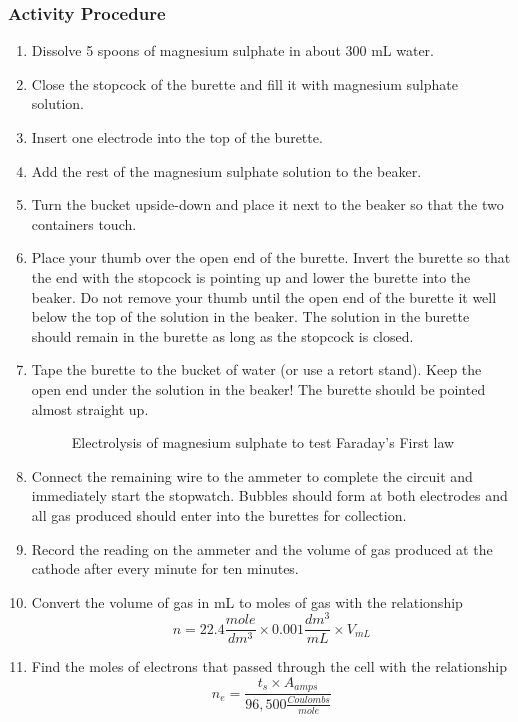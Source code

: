 \subsubsection*{Activity Procedure}
\begin{enumerate}
\item{Dissolve 5 spoons of magnesium sulphate in about 300 mL water.}
\item{Close the stopcock of the burette and fill it with magnesium sulphate solution.}
\item{Insert one electrode into the top of the burette.}
\item{Add the rest of the magnesium sulphate solution to the beaker.}
\item{Turn the bucket upside-down and place it next to the beaker so that the two containers touch.}
\item{Place your thumb over the open end of the burette. Invert the burette so that the end with the stopcock is pointing up and lower the burette into the beaker. Do not remove your thumb until the open end of the burette it well below the top of the solution in the beaker. The solution in the burette should remain in the burette as long as the stopcock is closed.}
\item{Tape the burette to the bucket of water (or use a retort stand). Keep the open end under the solution in the beaker! The burette should be pointed almost straight up.}
\begin{figure}[h!]
\begin{center}
\def\svgwidth{350pt}

\caption{Electrolysis of magnesium sulphate to test Faraday's First law}
\label{faraday-1}
\end{center}
\end{figure}
\item{Connect the remaining wire to the ammeter to complete the circuit and immediately start the stopwatch. Bubbles should form at both electrodes and all gas produced should enter into the burettes for collection.}
\item{Record the reading on the ammeter and the volume of gas produced at the cathode after every minute for ten minutes.}
\item{Convert the volume of gas in mL to moles of gas with the relationship $$ n = 22.4 \frac{mole}{dm^{3}} \times 0.001 \frac{dm^{3}}{mL} \times V_{mL} $$}
\item{Find the moles of electrons that passed through the cell with the relationship $$ n_{e} = \frac{t_{s} \times A_{amps}}{96,500 \frac{Coulombs}{mole}} $$}
\end{enumerate}

